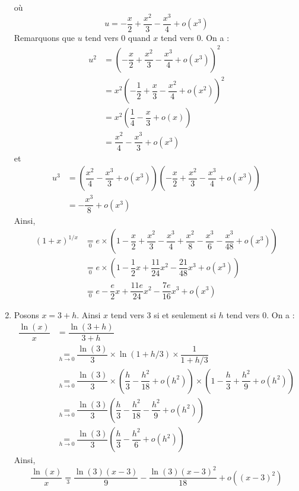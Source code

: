 \documentclass[a4paper,twoside,french,10pt]{VcCours}
\begin{document}
\begin{enumerate}
 où 
 $$u = -\dfrac{x}{2} + \dfrac{x^2}{3} - \dfrac{x^3}{4} + o(x^3)$$
 Remarquons que $u$ tend vers $0$ quand $x$ tend vers $0$. On a :
 \begin{align*}
 u^2 & = \left(-\dfrac{x}{2} + \dfrac{x^2}{3} - \dfrac{x^3}{4} + o(x^3)\right)^2\\
 &  = x^2  \left(-\dfrac{1}{2} + \dfrac{x}{3} - \dfrac{x^2}{4} + o(x^2)\right)^2 \\
 & = x^2 \left( \dfrac{1}{4} - \dfrac{x}{3} + o(x) \right) \\
 & = \dfrac{x^2}{4} - \dfrac{x^3}{3} + o(x^3)
 \end{align*}
 et 
  \begin{align*}
 u^3 & =\left(\dfrac{x^2}{4} - \dfrac{x^3}{3} + o(x^3) \right) \left( -\dfrac{x}{2} + \dfrac{x^2}{3} - \dfrac{x^3}{4} + o(x^3) \right) \\
 & = - \dfrac{x^3}{8} + o(x^3) 
 \end{align*}
 Ainsi,
 \begin{align*}
 (1+x)^{1/x} & \underset{0}{=} e \times  \left(1 -\dfrac{x}{2} + \dfrac{x^2}{3} - \dfrac{x^3}{4} + \dfrac{x^2}{8} - \dfrac{x^3}{6} - \dfrac{x^3}{48} + o(x^3) \right) \\
 &  \underset{0}{=} e \times \left(1- \dfrac{1}{2}x + \dfrac{11}{24}x^2 - \dfrac{21}{48}x^3 + o(x^3) \right) \\
 & \underset{0}{=}  e- \dfrac{e}{2}x + \dfrac{11e}{24}x^2 - \dfrac{7e}{16}x^3 + o(x^3)
 \end{align*}
 \item Posons $x=3+h$. Ainsi $x$ tend vers $3$ si et seulement si $h$ tend vers $0$. On a :
 \begin{align*}
 \dfrac{\ln(x)}{x} & = \dfrac{\ln(3+h)}{3+h} \\
 &  \underset{h \rightarrow 0}{=} \dfrac{\ln(3)}{3} \times \ln(1+h/3) \times \dfrac{1}{1+h/3} \\
 & \underset{h \rightarrow 0}{=}  \dfrac{\ln(3)}{3} \times \left( \dfrac{h}{3} -\dfrac{h^2}{18}+ o(h^2) \right) \times \left(1- \dfrac{h}{3}+ \dfrac{h^2}{9}  + o(h^2) \right) \\
 & \underset{h \rightarrow 0}{=}\dfrac{\ln(3)}{3} \left( \dfrac{h}{3} -\dfrac{h^2}{18}  - \dfrac{h^2}{9}+o(h^2)\right)\\
  & \underset{h \rightarrow 0}{=}\dfrac{\ln(3)}{3} \left( \dfrac{h}{3} -\dfrac{h^2}{6}   +o(h^2)\right)
 \end{align*}
 Ainsi,
$$ \dfrac{\ln(x)}{x} \underset{3}{=}  \dfrac{\ln(3)(x-3)}{9} -  \dfrac{\ln(3)(x-3)^2}{18}   +o((x-3)^2)$$
\end{enumerate}
\end{document}

